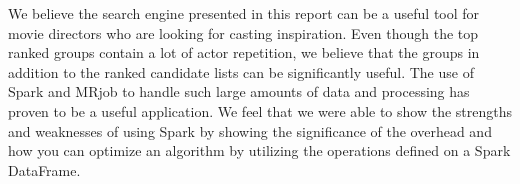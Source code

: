 We believe the search engine presented in this report can be a useful tool for movie directors who are looking for casting inspiration. Even though the top ranked groups contain a lot of actor repetition, we believe that the groups in addition to the ranked candidate lists can be significantly useful. The use of Spark and MRjob to handle such large amounts of data and processing has proven to be a useful application. We feel that we were able to show the strengths and weaknesses of using Spark by showing the significance of the overhead and how you can optimize an algorithm by utilizing the operations defined on a Spark DataFrame.